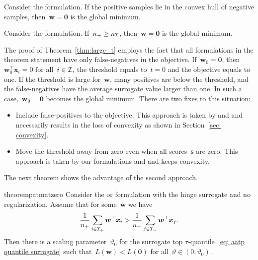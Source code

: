\begin{corollary}\label{cor:toppush}
  Consider the \TopPush formulation. If the positive samples lie in the convex hull of negative samples, then~$\bm{w}=\bm{0}$ is the global minimum.
\end{corollary}

\begin{corollary}\label{cor:topmean}
  Consider the \TopMeanK formulation. If~$n_{+}\geq n\tau$, then~$\bm{w}=\bm{0}$ is the global minimum.
\end{corollary}

\noindent The proof of Theorem~\ref{thm:large_t} employs the fact that all formulations in the theorem statement have only false-negatives in the objective. If~$\bm{w}_0=\bm{0}$, then~$\bm{w}_0^\top \bm{x}_i = 0$ for all~$i \in \mathcal{I},$ the threshold equals to~$t = 0$ and the objective equals to one. If the threshold is large for~$\bm{w}$, many positives are below the threshold, and the false-negatives have the average surrogate value larger than one. In such a case,~$\bm{w}_0 = \bm{0}$ becomes the global minimum. There are two fixes to this situation:
\begin{itemize}
  \item Include false-positives to the objective. This approach is taken by \Grill and \GrillNP and necessarily results in the loss of convexity as shown in Section~\ref{sec: convexity}.
  \item Move the threshold away from zero even when all scores~$\bm{s}$ are zero. This approach is taken by our formulations \PatMat and \PatMatNP and keeps convexity.
\end{itemize}
The next theorem shows the advantage of the second approach.

\begin{restatable}{theorem}{patmatzero}\label{thm:patmat_zero}
  Consider the \PatMat or \PatMatNP formulation with the hinge surrogate and no regularization. Assume that for some~$\bm{w}$ we have
  \begin{equation}\label{eq:patmat_zero}
    \frac{1}{n_{+}}\sum_{i \in \mathcal{I}_{+}}\bm{w}^{\top} \bm{x}_i > \frac{1}{n_{-}}\sum_{j \in \mathcal{I}_{-}}\bm{w}^{\top} \bm{x}_j.
  \end{equation}
  Then there is a scaling parameter~$\vartheta_0$ for the surrogate top $\tau$-quantile~\eqref{eq: aatp quantile surrogate} such that~$L(\bm{w}) < L(\bm{0})$ for all~$\vartheta \in (0, \vartheta_0)$.
\end{restatable}


